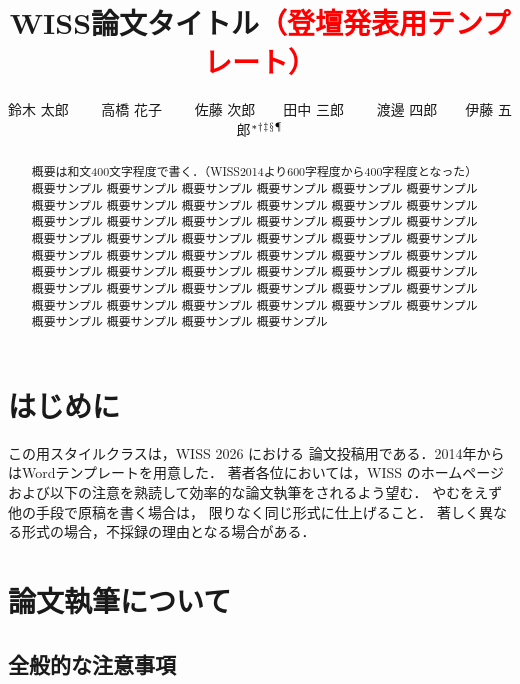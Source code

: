 \documentclass[twoside]{wiss}
\begin{document}
\title{WISS論文タイトル\textcolor{red}{（登壇発表用テンプレート）}}
\etitle{}%
%
%
%
\author{鈴木 太郎 　　高橋 花子
　　佐藤 次郎　　田中 三郎
　　渡邊 四郎　　伊藤 五郎${}^* {}^\dag {}^\ddag {}^\mathsection
{}^\mathparagraph$}

\begin{abstract}
概要は和文400文字程度で書く．（WISS2014より600字程度から400字程度となった）
概要サンプル 概要サンプル 概要サンプル 概要サンプル 概要サンプル 概要サンプル
概要サンプル 概要サンプル 概要サンプル 概要サンプル 概要サンプル 概要サンプル
概要サンプル 概要サンプル 概要サンプル 概要サンプル 概要サンプル 概要サンプル
概要サンプル 概要サンプル 概要サンプル 概要サンプル 概要サンプル 概要サンプル
概要サンプル 概要サンプル 概要サンプル 概要サンプル 概要サンプル 概要サンプル
概要サンプル 概要サンプル 概要サンプル 概要サンプル 概要サンプル 概要サンプル
概要サンプル 概要サンプル 概要サンプル 概要サンプル 概要サンプル 概要サンプル
概要サンプル 概要サンプル 概要サンプル 概要サンプル 概要サンプル 概要サンプル
概要サンプル 概要サンプル 概要サンプル 概要サンプル
\end{abstract}

\maketitle

\section{はじめに}

この\LaTeXe{}用スタイルクラスは，WISS 2026 における
論文投稿用である．2014年からはWordテンプレートを用意した．
著者各位においては，WISS のホームページ\cite{wiss}
および以下の注意を熟読して効率的な論文執筆をされるよう望む．
やむをえず他の手段で原稿を書く場合は，
限りなく同じ形式に仕上げること．
著しく異なる形式の場合，不採録の理由となる場合がある．

\section{論文執筆について}

\subsection{全般的な注意事項}
\end{document}
